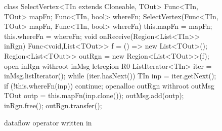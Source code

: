 \begin{figure}[t!]
\begin{numcodejava}
class SelectVertex<TIn extends Cloneable, TOut> {
  Func<TIn, TOut> mapFn;
  Func<TIn, bool> whereFn;
  SelectVertex(Func<TIn, TOut> mapFn, 
               Func<TIn, bool> whereFn) {
    this.mapFn = mapFn;
    this.whereFn = whereFn;
  }
  void onReceive(Region<List<TIn>> inRgn) {
    Func<void,List<TOut>> f = 
        () => new List<TOut>();
    Region<List<TOut>> outRgn =
        new Region<List<TOut>>(f);
    open inRgn withroot inMsg {
      letregion R0 {
        ListIterator<TIn> iter = 
            inMsg.listIterator();
        while (iter.hasNext()) {
          TIn inp = iter.getNext();
          if (!this.whereFn(inp)) continue;
          openalloc outRgn withroot outMsg {
            TOut outp = this.mapFn(inp.clone());
            outMsg.add(outp);
          }
        }
      }
    }
    inRgn.free();
    outRgn.transfer();
  }
}
\end{numcodejava}
\caption{ dataflow operator written in \name}
\label{fig:naiad-ex}
\end{figure}
